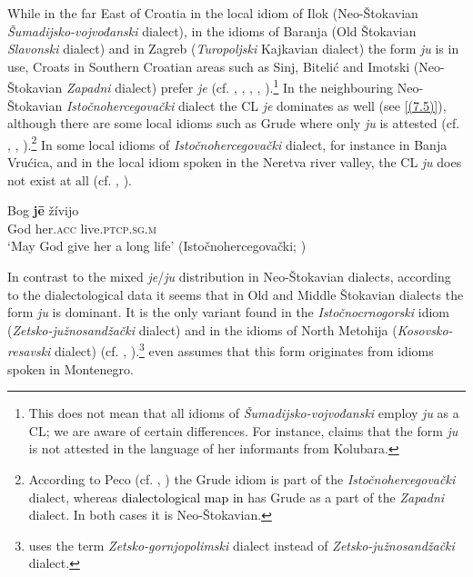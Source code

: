While in the far East of Croatia in the local idiom of Ilok (Neo-Štokavian \textit{Šumadijsko-vojvođanski} dialect), in the idioms of Baranja (Old Štokavian \textit{Slavonski} dialect) and in Zagreb (\textit{Turopoljski} Kajkavian dialect) the form \textit{ju} is in use, Croats in Southern Croatian areas such as Sinj, Bitelić and Imotski (Neo-Što\-ka\-vi\-an \textit{Zapadni} dialect) prefer \textit{je} (cf. \citealt[130]{Lisac03}, \citealt[331]{Sekeres77}, \citealt[64]{Hoyt12}, \citealt[185]{Curkovic14}, \citealt[120]{Simundic71}).\footnote{This does not mean that all idioms of \textit{Šumadijsko-vojvođanski} employ \textit{ju} as a CL; we are aware of certain differences. For instance, \citet[259]{Radovanovic06} claims that the form \textit{ju} is not attested in the language of her informants from Kolubara.} In the neighbouring Neo-Štokavian \textit{Istočnohercegovački} dialect the CL \textit{je} dominates as well (see \ref{(7.5)}), although there are some local idioms such as Grude where only \textit{ju} is attested (cf. \citealt[174]{Halilovic96}, \citealt[200]{Peco07a}, \citealt[311]{Peco07b}).\footnote{According to Peco (cf. \citealt[200]{Peco07a}, \citealt[311]{Peco07b}) the Grude idiom is part of the \textit{Istočnohercegovački} dialect, whereas \textcolor{black}{dialectological map in} \citet[162]{Lisac03} has Grude as a part of the \textit{Zapadni} dialect. In both cases it is Neo-Štokavian.} In some local idioms of \textit{Istočnohercegovački} dialect, for instance in Banja Vrućica, and in the local idiom spoken in the Neretva river valley, the CL \textit{ju} does not exist at all (cf. \citealt[371]{Dragicevic07}, \citealt[142]{VuksaNahod14}). 

\begin{exe}\ex\label{(7.5)}
\gll Bog  \textbf{jē}  žívijo \\
God her.\textsc{acc}  live.\textsc{ptcp.sg.m} \\
\glt ‘May God give her a long life’                                    
\hfill  (Istočnohercegovački; \citealt[113]{Lisac03})
\end{exe}

\noindent In contrast to the mixed \textit{je}/\textit{ju} distribution in Neo-Štokavian dialects, according to the dialectological data it seems that in Old and Middle Štokavian dialects the form \textit{ju} is dominant. It is the only variant found in the \textit{Istočnocrnogorski} idiom (\textit{Zetsko-južnosandžački} dialect) and in the idioms of North Metohija (\textit{Kosovsko-resavski} dialect) (cf. \citealt[200]{Peco07a}, \citealt[223]{Bukumiric03}).\footnote{\citet[200]{Peco07a} uses the term \textit{Zetsko-gornjopolimski} dialect instead of \textit{Zetsko-južnosandžački} dialect.} \citet[174]{Halilovic96} even assumes that this form originates from idioms spoken in Montenegro.

